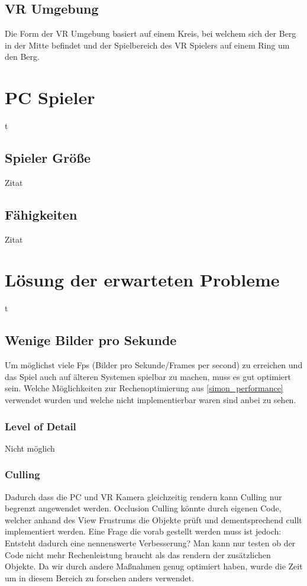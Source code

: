 \subsection{VR Umgebung}
Die Form der VR Umgebung basiert auf einem Kreis, bei welchem sich der Berg in der Mitte befindet und der Spielbereich des VR Spielers auf einem Ring um den Berg.

\section{PC Spieler}
t

\subsection{Spieler Größe}
Zitat

\subsection{Fähigkeiten}
Zitat

\section{Lösung der erwarteten Probleme}\label{simon_problems}
t

\subsection{Wenige Bilder pro Sekunde}
Um möglichst viele Fps (Bilder pro Sekunde/Frames per second) zu erreichen und das Spiel auch auf älteren Systemen spielbar zu machen, muss es gut optimiert sein. Welche Möglichkeiten zur Rechenoptimierung aus \ref{simon_performance} verwendet wurden und welche nicht implementierbar waren sind anbei zu sehen.

\subsubsection{Level of Detail}
Nicht möglich

\subsubsection{Culling}
Dadurch dass die PC und VR Kamera gleichzeitig rendern kann Culling nur begrenzt angewendet werden. Occlusion Culling könnte durch eigenen Code, welcher anhand des View Frustrums die Objekte prüft und dementsprechend cullt implementiert werden. Eine Frage die vorab gestellt werden muss ist jedoch: Entsteht dadurch eine nennenswerte Verbesserung? Man kann nur testen ob der Code nicht mehr Rechenleistung braucht als das rendern der zusätzlichen Objekte. Da wir durch andere Maßnahmen genug optimiert haben, wurde die Zeit um in diesem Bereich zu forschen anders verwendet.

